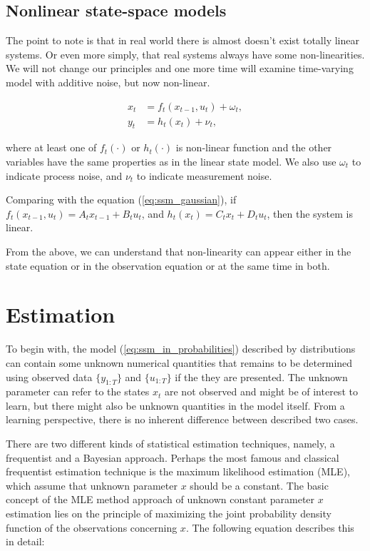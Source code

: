 \subsection{Nonlinear state-space models}

The point to note is that in real world there is almost doesn't exist totally linear systems. Or even more simply, that real systems always have some non-linearities. We will not change our principles and one more time will examine time-varying model with additive noise, but now non-linear.

\begin{subequations}
\begin{align}
x_t &= f_t(x_{t-1}, u_t) + \omega_t, \\
y_t &= h_t(x_t) + \nu_t,
\end{align}
\end{subequations}

where at least one of \(f_t(\cdot)\) or \(h_t(\cdot)\) is non-linear function and the other variables have the same properties as in the linear state model. We also use \(\omega_t\) to indicate process noise, and \(\nu_t\) to indicate measurement noise.

Comparing with the equation (\ref{eq:ssm_gaussian}), if \(f_t(x_{t-1}, u_t) = A_t x_{t-1} + B_t u_t\), and \(h_t(x_t) = C_t x_t + D_t u_t\), then the system is
linear.

From the above, we can understand that non-linearity can appear either in the state equation or in the observation equation or at the same time in both.


\section{Estimation}

To begin with, the model (\ref{eq:ssm_in_probabilities}) described by distributions can contain some unknown numerical quantities that remains to be determined using observed data \(\{y_{1:T}\}\) and \(\{u_{1:T}\}\) if the they are presented. The unknown parameter can refer to the states \(x_t\) are not observed and might be of interest to learn, but there might also be unknown quantities in the model itself. From a learning perspective, there is no inherent difference between described two cases.

There are two different kinds of statistical estimation techniques, namely, a frequentist and a Bayesian approach. Perhaps the most famous and classical frequentist estimation technique is the maximum likelihood estimation (MLE), which assume that unknown parameter \(x\) should be a constant. The basic concept of the MLE method approach of unknown constant parameter \(x\) estimation lies on the principle  of maximizing the joint probability density function of the observations concerning
\(x\). The following equation describes this in detail:

